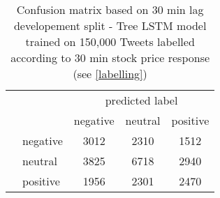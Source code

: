 \documentclass[a4paper,12pt]{article}%
\begin{document}
 
\begin{table}
\centering
\captionsetup{justification=centering}
 \begin{tabular}{|c|l|c|c|c|}
 \cline{1-5}
 \multicolumn{2}{|c|}{} & \multicolumn{3}{c|}{predicted label} \\ \cline{3-5}
 \multicolumn{2}{|c|}{} & \multicolumn{1}{c|}{negative} & \multicolumn{1}{c|}{neutral} & \multicolumn{1}{c|}{positive} \\
 \hline
 \parbox[t]{2mm}{} & negative & 3012 & 2310 & 1512 \\
 & neutral & 3825 & 6718 & 2940\\
 & positive & 1956 & 2301 & 2470\\
 \hline
 \end{tabular}
\caption{Confusion matrix based on 30 min lag developement split - Tree LSTM model trained on 150,000 Tweets labelled according to 30 min stock price response (see \ref{labelling}) \label{table:conf_matrix_1}}
\end{table}
\end{document}
